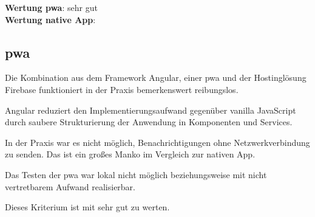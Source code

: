 \textbf{Wertung \ac{pwa}}: sehr gut\\
\textbf{Wertung native App}:  \\

\subsection{\ac{pwa}}
Die Kombination aus dem Framework Angular, einer \ac{pwa} und der Hostinglösung Firebase funktioniert in der Praxis bemerkenswert reibungslos.

Angular reduziert den Implementierungsaufwand gegenüber vanilla JavaScript durch saubere Strukturierung der Anwendung in Komponenten und Services.

In der Praxis war es nicht möglich, Benachrichtigungen ohne Netzwerkverbindung zu senden. Das ist ein großes Manko im Vergleich zur nativen App.

Das Testen der \ac{pwa} war lokal nicht möglich beziehungsweise mit nicht vertretbarem Aufwand realisierbar.

Dieses Kriterium ist mit sehr gut zu werten.